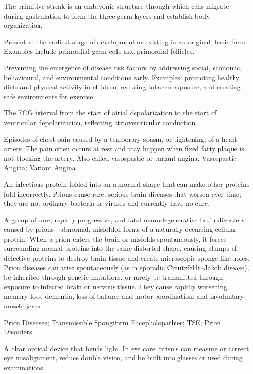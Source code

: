  The primitive streak is an embryonic structure through which cells migrate during gastrulation to form the three germ layers and establish body organization.

 Present at the earliest stage of development or existing in an original, basic form. Examples include primordial germ cells and primordial follicles.

 Preventing the emergence of disease risk factors by addressing social, economic,
behavioural, and environmental conditions early. Examples: promoting healthy diets and
physical activity in children, reducing tobacco exposure, and creating safe environments
for exercise.

 The ECG interval from the start of atrial depolarization to the start of ventricular depolarization, reflecting atrioventricular conduction.

 Episodes of chest pain caused by a temporary spasm, or tightening, of a heart artery. The pain often occurs at rest and may happen when fixed fatty plaque is not blocking the artery. Also called vasospastic or variant angina.
\synonyms
Vasospastic Angina; Variant Angina

 An infectious protein folded into an abnormal shape that can make other proteins fold incorrectly. Prions cause rare, serious brain diseases that worsen over time; they are not ordinary bacteria or viruses and currently have no cure.

 A group of rare, rapidly progressive, and fatal neurodegenerative brain disorders caused by prions---abnormal, misfolded forms of a naturally occurring cellular protein. When a prion enters the brain or misfolds spontaneously, it forces surrounding normal proteins into the same distorted shape, causing clumps of defective proteins to destroy brain tissue and create microscopic sponge-like holes. Prion diseases can arise spontaneously (as in sporadic Creutzfeldt--Jakob disease), be inherited through genetic mutations, or rarely be transmitted through exposure to infected brain or nervous tissue. They cause rapidly worsening memory loss, dementia, loss of balance and motor coordination, and involuntary muscle jerks.

\synonyms
Prion Diseases; Transmissible Spongiform Encephalopathies; TSE; Prion Disorders

 A clear optical device that bends light. In eye care, prisms can measure or correct eye misalignment, reduce double vision, and be built into glasses or used during examinations.

